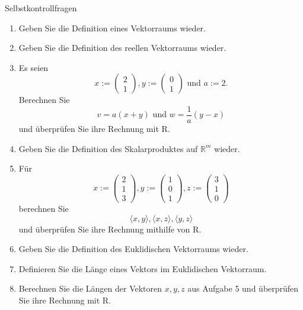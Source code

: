 \documentclass[
  8pt,
  ignorenonframetext,
]{beamer}
\providecommand{\tightlist}{%
  \setlength{\itemsep}{0pt}\setlength{\parskip}{0pt}}
\begin{document}
\begin{frame}{Selbstkontrollfragen}
\protect\hypertarget{selbstkontrollfragen}{}
\footnotesize
{}

\begin{enumerate}
\tightlist
\item
  Geben Sie die Definition eines Vektorraums wieder.
\item
  Geben Sie die Definition des reellen Vektorraums wieder.
\item
  Es seien \begin{equation}
  x := \begin{pmatrix} 2 \\ 1 \end{pmatrix}, 
  y := \begin{pmatrix} 0 \\ 1 \end{pmatrix}
  \mbox{ und } 
  a := 2. 
  \end{equation} Berechnen Sie \begin{equation}
  v = a(x+y) \mbox{ und } w = \frac{1}{a}(y-x)
  \end{equation} und überprüfen Sie ihre Rechnung mit R.
\item
  Geben Sie die Definition des Skalarproduktes auf \(\mathbb{R}^m\)
  wieder.
\item
  Für \begin{equation}
  x := \begin{pmatrix} 2 \\ 1 \\ 3 \end{pmatrix},
  y := \begin{pmatrix} 1 \\ 0 \\ 1 \end{pmatrix},
  z := \begin{pmatrix} 3 \\ 1 \\ 0 \end{pmatrix} 
  \end{equation} berechnen Sie \begin{equation}
  \langle x,y \rangle, \langle x, z \rangle, \langle y,z \rangle
  \end{equation} und überprüfen Sie ihre Rechnung mithilfe von R.
\item
  Geben Sie die Definition des Euklidischen Vektorraums wieder.
\item
  Definieren Sie die Länge eines Vektors im Euklidischen Vektorraum.
\item
  Berechnen Sie die Längen der Vektoren \(x,y,z\) aus Aufgabe 5 und
  überprüfen Sie ihre Rechnung mit R.
\end{enumerate}
\end{frame}
\end{document}
